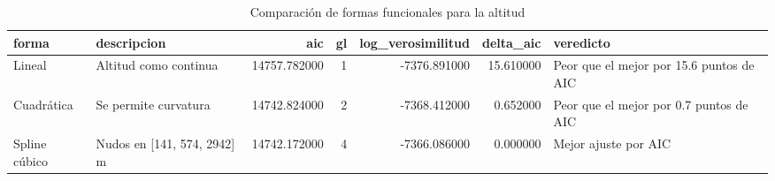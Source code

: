 \begin{table}[htbp]
\caption{Comparación de formas funcionales para la altitud}
\label{tab:tabla_37_forma_funcional_altitud}
\begin{tabular}{llrrrrl}
\toprule
forma & descripcion & aic & gl & log\_verosimilitud & delta\_aic & veredicto \\
\midrule
Lineal & Altitud como continua & 14757.782000 & 1 & -7376.891000 & 15.610000 & Peor que el mejor por 15.6 puntos de AIC \\
Cuadrática & Se permite curvatura & 14742.824000 & 2 & -7368.412000 & 0.652000 & Peor que el mejor por 0.7 puntos de AIC \\
Spline cúbico & Nudos en [141, 574, 2942] m & 14742.172000 & 4 & -7366.086000 & 0.000000 & Mejor ajuste por AIC \\
\bottomrule
\end{tabular}
\end{table}
